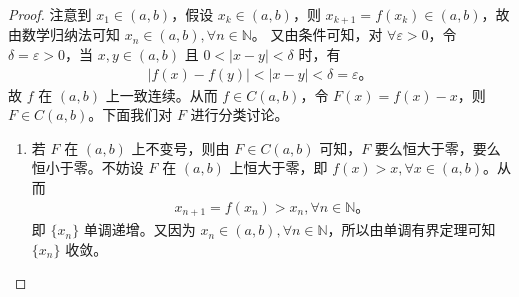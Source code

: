 \documentclass[../../main.tex]{subfiles}
\begin{document}
\begin{proof}
注意到 $x_1 \in (a, b)$，假设 $x_k \in (a, b)$，则 $x_{k+1} = f(x_k) \in (a, b)$，故由数学归纳法可知 $x_n \in (a, b), \forall n \in \mathbb{N}$。
又由条件可知，对 $\forall \varepsilon > 0$，令 $\delta = \varepsilon > 0$，当 $x, y \in (a, b)$ 且 $0 < |x - y| < \delta$ 时，有
\begin{align*}
|f(x) - f(y)| < |x - y| < \delta = \varepsilon。
\end{align*}
故 $f$ 在 $(a, b)$ 上一致连续。从而 $f \in C(a, b)$，令 $F(x) = f(x) - x$，则 $F \in C(a, b)$。下面我们对 $F$ 进行分类讨论。

\begin{enumerate}[(1)]
\item 若 $F$ 在 $(a, b)$ 上不变号，则由 $F \in C(a, b)$ 可知，$F$ 要么恒大于零，要么恒小于零。不妨设 $F$ 在 $(a, b)$ 上恒大于零，即 $f(x) > x, \forall x \in (a, b)$。从而
\begin{align*}
x_{n+1} = f(x_n) > x_n, \forall n \in \mathbb{N}。
\end{align*}
即 $\{x_n\}$ 单调递增。又因为 $x_n \in (a, b), \forall n \in \mathbb{N}$，所以由单调有界定理可知 $\{x_n\}$ 收敛。


\end{enumerate}
\end{proof}
\end{document}
